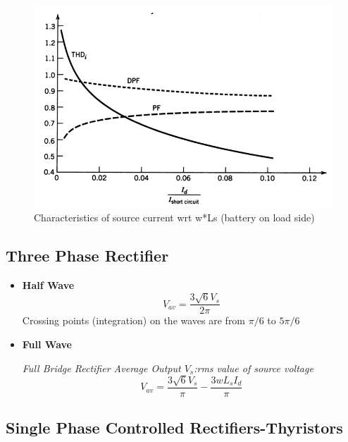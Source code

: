 \documentclass[twocolumn, ]{article}
\begin{document}
\begin{figure}[!ht]
	\includegraphics[scale=0.3]{avcur}
	\caption{Characteristics of source current wrt w*Ls (battery on load side)}
\end{figure}

\subsection*{\small Three Phase  Rectifier}

\begin{itemize}



\item \textbf{Half Wave} 
\begin{equation*}
	V_{av}=\dfrac{3 \sqrt{6}V_{s}} {2 \pi}
\end{equation*}
Crossing points (integration) on the waves are from $\pi /6$ to $5 \pi /6$

 

\item \textbf{Full Wave} 

\textit{Full Bridge Rectifier Average Output $V_{s}$:rms value of source voltage}
\begin{equation*}
 	V_{av}=\frac{3 \sqrt{6} V_{s}}{\pi }-\frac{3wL_{s}I_{d}}{\pi }
\end{equation*}





\end{itemize}


\subsection*{\small Single Phase Controlled Rectifiers-Thyristors}
\end{document}
